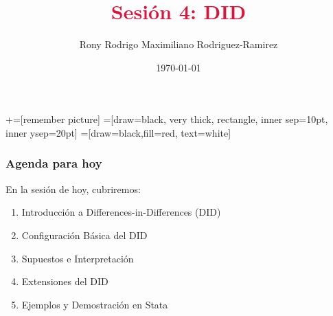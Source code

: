 \documentclass[notes,10pt,aspectratio=169]{beamer}
\title[]{\textcolor{crimson}{Sesión 4: DID}}
\author[RRMRR]{Rony Rodrigo Maximiliano Rodriguez-Ramirez}
\institute[Harvard]{\small{Econ Thaki \\ Harvard University}}
\date{\today}
\begin{document}
\newcommand\marktopleft[1]{%
    \tikz[overlay,remember picture] 
        \node (marker-#1-a) at (-.3em,.3em) {};%
}
\newcommand\markbottomright[2]{%
    \tikz[overlay,remember picture] 
        \node (marker-#1-b) at (0em,0em) {};%
}
+=[remember picture] 
 =[draw=black, very thick, rectangle, inner sep=10pt, inner ysep=20pt]
 =[draw=black,fill=red, text=white]



\begin{frame}
  \maketitle
\end{frame}

\begin{frame}
  \frametitle{Agenda para hoy}

  En la sesión de hoy, cubriremos:
  \begin{enumerate}
    \item Introducción a Differences-in-Differences (DID)
    \item Configuración Básica del DID
    \item Supuestos e Interpretación
    \item Extensiones del DID
    \item Ejemplos y Demostración en Stata
  \end{enumerate}
\end{frame}
\end{document}
